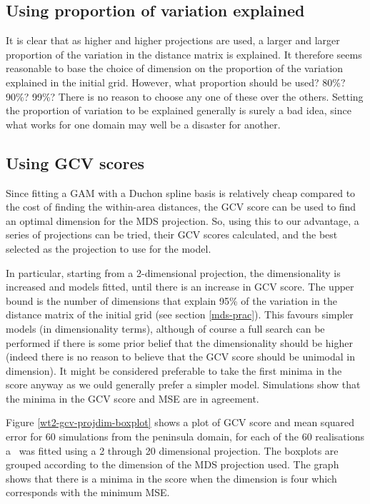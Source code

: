 \subsection{Using proportion of variation explained}

It is clear that as higher and higher projections are used, a larger and larger proportion of the variation in the distance matrix is explained. It therefore seems reasonable to base the choice of dimension on the proportion of the variation explained in the initial grid. However, what proportion should be used? 80\%? 90\%? 99\%? There is no reason to choose any one of these over the others. Setting the proportion of variation to be explained generally is surely a bad idea, since what works for one domain may well be a disaster for another.


\subsection{Using GCV scores}

Since fitting a GAM with a Duchon spline basis is relatively cheap compared to the cost of finding the within-area distances, the GCV score can be used to find an optimal dimension for the MDS projection. So, using this to our advantage, a series of projections can be tried, their GCV scores calculated, and the best selected as the projection to use for the model.

In particular, starting from a 2-dimensional projection, the dimensionality is increased  and models fitted, until there is an increase in GCV score. The upper bound is the number of dimensions that explain 95\% of the variation in the distance matrix of the initial grid (see section \ref{mds-prac}).  This favours simpler models (in dimensionality terms), although of course a full search can be performed if there is some prior belief that the dimensionality should be higher (indeed there is no reason to believe that the GCV score should be unimodal in dimension). It might be considered preferable to take the first minima in the score anyway as we ould generally prefer a simpler model. Simulations show that the minima in the GCV score and MSE are in agreement.

Figure \ref{wt2-gcv-projdim-boxplot} shows a plot of GCV score and mean squared error for 60 simulations from the peninsula domain, for each of the 60 realisations a \mdsds\ was fitted using a 2 through 20 dimensional projection. The boxplots are grouped according to the dimension of the MDS projection used. The graph shows that there is a minima in the score when the dimension is four which corresponds with the minimum MSE.

